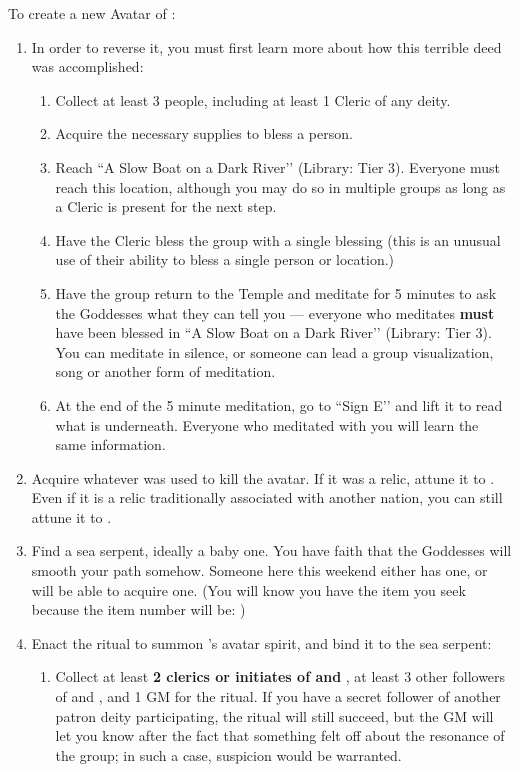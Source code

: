 \documentclass[green]{GL2020}
\begin{document}
To create a new Avatar of \cEbb{}:
\begin{enumerate}
  \item In order to reverse it, you must first learn more about how this terrible deed was accomplished: 
\begin{enumerate}
	\item Collect at least 3 people, including at least 1 Cleric of any deity.
	\item Acquire the  necessary supplies to bless a person.
	\item Reach ``A Slow Boat on a Dark River’’ (Library: Tier 3). Everyone must reach this location, although you may do so in multiple groups as long as a Cleric is present for the next step.
	\item Have the Cleric bless the group with a single blessing (this is an unusual use of their ability to bless a single person or location.)
	\item Have the group return to the Temple and meditate for 5 minutes to ask the Goddesses what they can tell you — everyone who meditates \textbf{must} have been blessed in ``A Slow Boat on a Dark River’’ (Library: Tier 3). You can meditate in silence, or someone can lead a group visualization, song or another form of meditation.
	\item At the end of the 5 minute meditation, go to ``Sign E’’ and lift it to read what is underneath. Everyone who meditated with you will learn the same information.
\end{enumerate}
  \item Acquire whatever was used to kill the \cEbb{} avatar. If it was a relic, attune it to \pShip{}. Even if it is a relic traditionally associated with another nation, you can still attune it to \pShip{}.
  \item Find a sea serpent, ideally a baby one. You have faith that the Goddesses will smooth your path somehow. Someone here this weekend either has one, or will be able to acquire one. (You will know you have the item you seek because the item number will be: \iBabySeaSerpent{\MYnumber})
  \item Enact the ritual to summon \cEbb{}’s avatar spirit, and bind it to the sea serpent:
  \begin{enumerate}
    \item Collect at least \textbf{2 clerics or initiates of \cEbb{} and \cFlow{}}, at least 3 other followers of \cEbb{} and \cFlow{}, and 1 GM for the ritual. If you have a secret follower of another patron deity participating, the ritual will still succeed, but the GM will let you know after the fact that something felt off about the resonance of the group; in such a case, suspicion would be warranted. 

\end{enumerate}
\end{enumerate}
\end{document}

